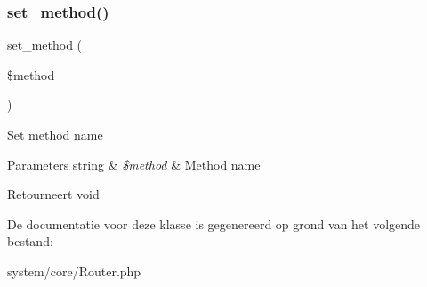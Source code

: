 \subsubsection{\texorpdfstring{set\_method()}{set\_method()}}
{\footnotesize\ttfamily set\+\_\+method (\begin{DoxyParamCaption}\item[{}]{\$method }\end{DoxyParamCaption})}

Set method name


\begin{DoxyParams}[1]{Parameters}
string & {\em \$method} & Method name \\
\hline
\end{DoxyParams}
\begin{DoxyReturn}{Retourneert}
void 
\end{DoxyReturn}


De documentatie voor deze klasse is gegenereerd op grond van het volgende bestand\+:\begin{DoxyCompactItemize}
\item 
system/core/Router.\+php\end{DoxyCompactItemize}
